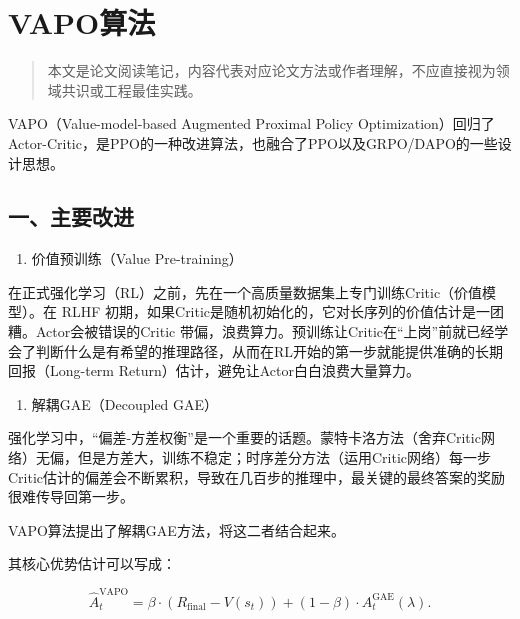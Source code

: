 \clearpage

\hypertarget{vapoux7b97ux6cd5}{%
\section{VAPO算法}\label{vapoux7b97ux6cd5}}

\begin{quote}
本文是论文阅读笔记，内容代表对应论文方法或作者理解，不应直接视为领域共识或工程最佳实践。
\end{quote}

VAPO（Value-model-based Augmented Proximal Policy Optimization）回归了Actor-Critic，是PPO的一种改进算法，也融合了PPO以及GRPO/DAPO的一些设计思想。

\hypertarget{ux4e00ux4e3bux8981ux6539ux8fdb}{%
\subsection{一、主要改进}\label{ux4e00ux4e3bux8981ux6539ux8fdb}}

\begin{enumerate}
\def\labelenumi{\arabic{enumi}.}
\tightlist
\item
  价值预训练（Value Pre-training）
\end{enumerate}

在正式强化学习（RL）之前，先在一个高质量数据集上专门训练Critic（价值模型）。在 RLHF 初期，如果Critic是随机初始化的，它对长序列的价值估计是一团糟。Actor会被错误的Critic 带偏，浪费算力。预训练让Critic在``上岗''前就已经学会了判断什么是有希望的推理路径，从而在RL开始的第一步就能提供准确的长期回报（Long-term Return）估计，避免让Actor白白浪费大量算力。

\begin{enumerate}
\def\labelenumi{\arabic{enumi}.}
\setcounter{enumi}{1}
\tightlist
\item
  解耦GAE（Decoupled GAE）
\end{enumerate}

强化学习中，``偏差-方差权衡''是一个重要的话题。蒙特卡洛方法（舍弃Critic网络）无偏，但是方差大，训练不稳定；时序差分方法（运用Critic网络）每一步Critic估计的偏差会不断累积，导致在几百步的推理中，最关键的最终答案的奖励很难传导回第一步。

VAPO算法提出了解耦GAE方法，将这二者结合起来。

其核心优势估计可以写成：

\[
\hat{A}_t^{\mathrm{VAPO}}
=
\beta\cdot(R_{\mathrm{final}}-V(s_t))
+
(1-\beta)\cdot A_t^{\mathrm{GAE}}(\lambda).
\]

